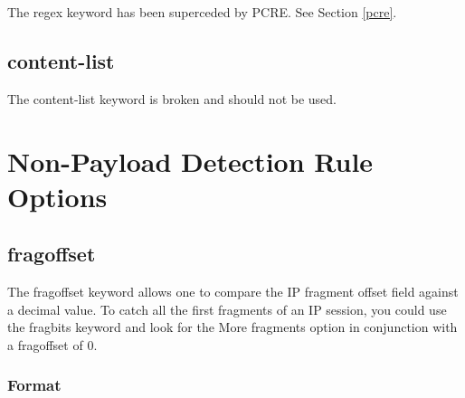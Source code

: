 \documentclass[english]{report}
\begin{document}
The regex keyword has been superceded by PCRE.  See Section \ref{pcre}.

\subsection{content-list}

The content-list keyword is broken and should not be used.

%
%
%
%


\section{Non-Payload Detection Rule Options}
\subsection{fragoffset \label{fragoffset section}}

The fragoffset keyword allows one to compare the IP fragment offset
field against a decimal value. To catch all the first fragments of
an IP session, you could use the fragbits keyword and look for the
More fragments option in conjunction with a fragoffset of 0.


\subsubsection{Format}
\end{document}
